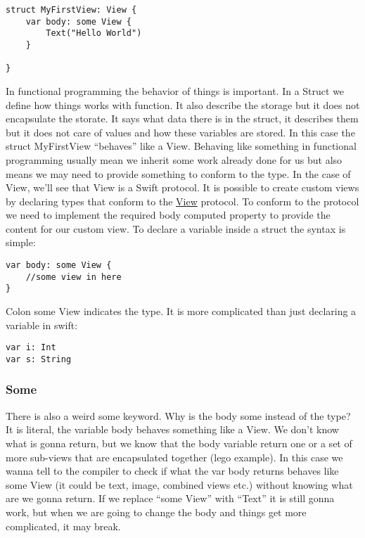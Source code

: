 \documentclass[]{article}
\begin{document}
\begin{verbatim}
struct MyFirstView: View {
    var body: some View {
        Text("Hello World")
    }

}
\end{verbatim}

In functional programming the behavior of things is important. In a
Struct we define how things works with function. It also describe the
storage but it does not encapsulate the storate. It says what data there
is in the struct, it describes them but it does not care of values and
how these variables are stored. In this case the struct MyFirstView
``behaves'' like a View. Behaving like something in functional
programming usually mean we inherit some work already done for us but
also means we may need to provide something to conform to the type. In
the case of View, we'll see that View is a Swift protocol. It is
possible to create custom views by declaring types that conform to the
\href{https://developer.apple.com/documentation/swiftui/view}{View}
protocol. To conform to the protocol we need to implement the required
body computed property to provide the content for our custom view. To
declare a variable inside a struct the syntax is simple:

\begin{verbatim}
var body: some View {
    //some view in here
}
\end{verbatim}

Colon some View indicates the type. It is more complicated than just
declaring a variable in swift:

\begin{verbatim}
var i: Int
var s: String
\end{verbatim}

\hypertarget{some}{%
\subsubsection{Some}\label{some}}

There is also a weird some keyword. Why is the body some instead of the
type? It is literal, the variable body behaves something like a View. We
don't know what is gonna return, but we know that the body variable
return one or a set of more sub-views that are encapsulated together
(lego example). In this case we wanna tell to the compiler to check if
what the var body returns behaves like some View (it could be text,
image, combined views etc.) without knowing what are we gonna return. If
we replace ``some View'' with ``Text'' it is still gonna work, but when
we are going to change the body and things get more complicated, it may
break.
\end{document}
